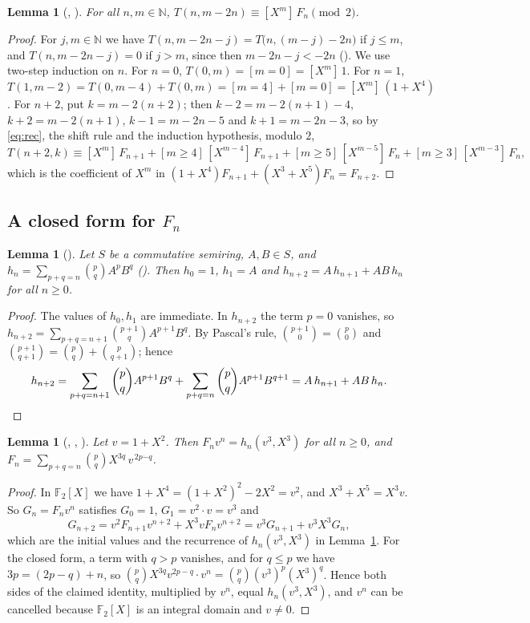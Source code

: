 \documentclass[11pt]{amsart}
\theoremstyle{plain}
\newtheorem{lemma}[theorem]{Lemma}
\theoremstyle{definition}
\newcommand{\F}{\mathbb{F}_2}
\newcommand{\N}{\mathbb{N}}
\newcommand{\tsub}{\mathbin{\dot{-}}}
\newcommand{\co}[2]{[X^{#1}]\,#2}
\begin{document}
\begin{lemma}[, ]\label{lem:coeff}
For all $n,m\in\N$, $T(n,m-2n)\equiv\co{m}{F_n}\pmod 2$.
\end{lemma}

\begin{proof}
For $j,m\in\N$ we have $T(n,m-2n-j)=T\bigl(n,(m-j)-2n\bigr)$ if $j\le m$, and $T(n,m-2n-j)=0$ if $j>m$, since then $m-2n-j<-2n$ ().
We use two-step induction on $n$. For $n=0$, $T(0,m)=[m=0]=\co{m}{1}$. For $n=1$, $T(1,m-2)=T(0,m-4)+T(0,m)=[m=4]+[m=0]=\co{m}{(1+X^4)}$. For $n+2$, put $k=m-2(n+2)$; then $k-2=m-2(n+1)-4$, $k+2=m-2(n+1)$, $k-1=m-2n-5$ and $k+1=m-2n-3$, so by \eqref{eq:rec}, the shift rule and the induction hypothesis, modulo $2$,
\[
  T(n+2,k)\equiv \co{m}{F_{n+1}}+[m\ge4]\,\co{m-4}{F_{n+1}}+[m\ge5]\,\co{m-5}{F_n}+[m\ge3]\,\co{m-3}{F_n},
\]
which is the coefficient of $X^m$ in $(1+X^4)F_{n+1}+(X^3+X^5)F_n=F_{n+2}$.
\end{proof}

\subsection{\texorpdfstring{A closed form for $F_n$}{A closed form for F\_n}}

\begin{lemma}[]\label{lem:hsum}
Let $S$ be a commutative semiring, $A,B\in S$, and $h_n=\sum_{p+q=n}\binom pq A^pB^q$ (). Then $h_0=1$, $h_1=A$ and $h_{n+2}=A\,h_{n+1}+AB\,h_n$ for all $n\ge0$.
\end{lemma}

\begin{proof}
The values of $h_0,h_1$ are immediate. In $h_{n+2}$ the term $p=0$ vanishes, so $h_{n+2}=\sum_{p+q=n+1}\binom{p+1}{q}A^{p+1}B^q$. By Pascal's rule, $\binom{p+1}{0}=\binom p0$ and $\binom{p+1}{q+1}=\binom pq+\binom p{q+1}$; hence
\[
  h_{n+2}=\sum_{p+q=n+1}\binom pqA^{p+1}B^q+\sum_{p+q=n}\binom pqA^{p+1}B^{q+1}=A\,h_{n+1}+AB\,h_n.\qedhere
\]
\end{proof}

\begin{lemma}[, , ]\label{lem:closed}
Let $v=1+X^2$. Then $F_nv^n=h_n(v^3,X^3)$ for all $n\ge0$, and
$F_n=\sum_{p+q=n}\binom pq X^{3q}\,v^{\,2p\tsub q}$.
\end{lemma}

\begin{proof}
In $\F[X]$ we have $1+X^4=(1+X^2)^2-2X^2=v^2$, and $X^3+X^5=X^3v$. So $G_n=F_nv^n$ satisfies $G_0=1$, $G_1=v^2\cdot v=v^3$ and
\[
  G_{n+2}=v^2F_{n+1}v^{n+2}+X^3vF_nv^{n+2}=v^3G_{n+1}+v^3X^3G_n,
\]
which are the initial values and the recurrence of $h_n(v^3,X^3)$ in Lemma~\ref{lem:hsum}.
For the closed form, a term with $q>p$ vanishes, and for $q\le p$ we have $3p=(2p-q)+n$, so $\binom pqX^{3q}v^{2p-q}\cdot v^n=\binom pq(v^3)^p(X^3)^q$. Hence both sides of the claimed identity, multiplied by $v^n$, equal $h_n(v^3,X^3)$, and $v^n$ can be cancelled because $\F[X]$ is an integral domain and $v\ne0$.
\end{proof}
\end{document}
